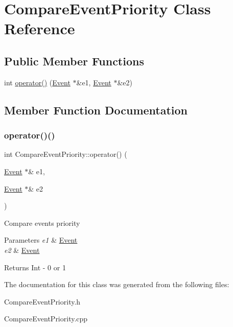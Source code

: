 \hypertarget{classCompareEventPriority}{}\section{Compare\+Event\+Priority Class Reference}
\label{classCompareEventPriority}
\subsection*{Public Member Functions}
\begin{DoxyCompactItemize}
\item 
int \hyperlink{classCompareEventPriority_af585ca697c51d4bef28759b93c2e437e}{operator()} (\hyperlink{classEvent}{Event} $\ast$\&e1, \hyperlink{classEvent}{Event} $\ast$\&e2)
\end{DoxyCompactItemize}


\subsection{Member Function Documentation}
\mbox{\label{classCompareEventPriority_af585ca697c51d4bef28759b93c2e437e}} 
\subsubsection{\texorpdfstring{operator()()}{operator()()}}
{\footnotesize\ttfamily int Compare\+Event\+Priority\+::operator() (\begin{DoxyParamCaption}\item[{\hyperlink{classEvent}{Event} $\ast$\&}]{e1,  }\item[{\hyperlink{classEvent}{Event} $\ast$\&}]{e2 }\end{DoxyParamCaption})}

Compare events priority 
\begin{DoxyParams}{Parameters}
{\em e1} & \hyperlink{classEvent}{Event} \\
\hline
{\em e2} & \hyperlink{classEvent}{Event} \\
\hline
\end{DoxyParams}
\begin{DoxyReturn}{Returns}
Int -\/ 0 or 1 
\end{DoxyReturn}


The documentation for this class was generated from the following files\+:\begin{DoxyCompactItemize}
\item 
Compare\+Event\+Priority.\+h\item 
Compare\+Event\+Priority.\+cpp\end{DoxyCompactItemize}
